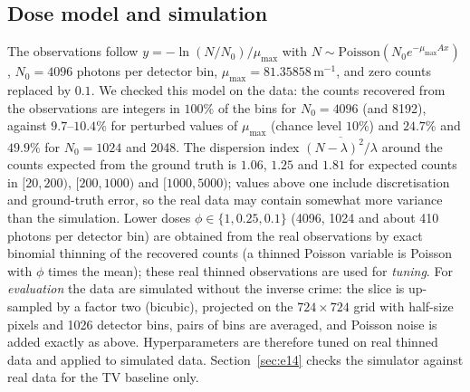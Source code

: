 \subsection{Dose model and simulation}\label{sec:sim3}
The observations follow $y=-\ln(N/N_0)/\mu_{\max}$ with $N\sim\mathrm{Poisson}(N_0e^{-\mu_{\max}Ax})$, $N_0=4096$ photons per detector bin, $\mu_{\max}=81.35858\,\mathrm{m^{-1}}$, and zero counts replaced by $0.1$.
We checked this model on the data: the counts recovered from the observations are integers in $100\%$ of the bins for $N_0=4096$ (and 8192), against $9.7$--$10.4\%$ for perturbed values of $\mu_{\max}$ (chance level $10\%$) and $24.7\%$ and $49.9\%$ for $N_0=1024$ and 2048.
The dispersion index $\overline{(N-\lambda)^2/\lambda}$ around the counts expected from the ground truth is $1.06$, $1.25$ and $1.81$ for expected counts in $[20,200)$, $[200,1000)$ and $[1000,5000)$; values above one include discretisation and ground-truth error, so the real data may contain somewhat more variance than the simulation.
Lower doses $\phi\in\{1,0.25,0.1\}$ (4096, 1024 and about 410 photons per detector bin) are obtained from the real observations by exact binomial thinning of the recovered counts (a thinned Poisson variable is Poisson with $\phi$ times the mean); these real thinned observations are used for \emph{tuning}.
For \emph{evaluation} the data are simulated without the inverse crime: the slice is up-sampled by a factor two (bicubic), projected on the $724\times724$ grid with half-size pixels and 1026 detector bins, pairs of bins are averaged, and Poisson noise is added exactly as above.
Hyperparameters are therefore tuned on real thinned data and applied to simulated data. Section~\ref{sec:e14} checks the simulator against real data for the TV baseline only.

